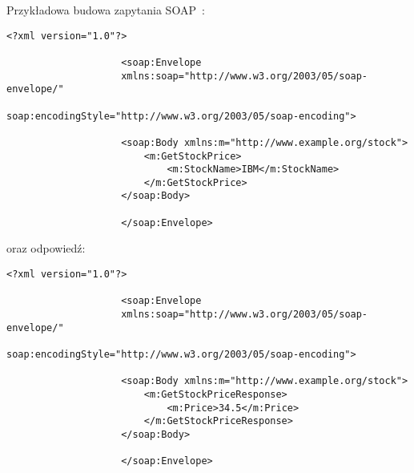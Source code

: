 \begin{description}
				Przykładowa budowa zapytania SOAP~\cite{SoapMsg}:

				\begin{lstlisting}[label=lst:soapReq, xleftmargin=0.5cm]
					<?xml version="1.0"?>

					<soap:Envelope
					xmlns:soap="http://www.w3.org/2003/05/soap-envelope/"
					soap:encodingStyle="http://www.w3.org/2003/05/soap-encoding">

					<soap:Body xmlns:m="http://www.example.org/stock">
						<m:GetStockPrice>
							<m:StockName>IBM</m:StockName>
						</m:GetStockPrice>
					</soap:Body>

					</soap:Envelope>
				\end{lstlisting}

				oraz odpowiedź:
				\begin{lstlisting}[label=lst:soapRes, xleftmargin=0.5cm]
					<?xml version="1.0"?>

					<soap:Envelope
					xmlns:soap="http://www.w3.org/2003/05/soap-envelope/"
					soap:encodingStyle="http://www.w3.org/2003/05/soap-encoding">

					<soap:Body xmlns:m="http://www.example.org/stock">
						<m:GetStockPriceResponse>
							<m:Price>34.5</m:Price>
						</m:GetStockPriceResponse>
					</soap:Body>

					</soap:Envelope>
				\end{lstlisting}
				

\end{description}
